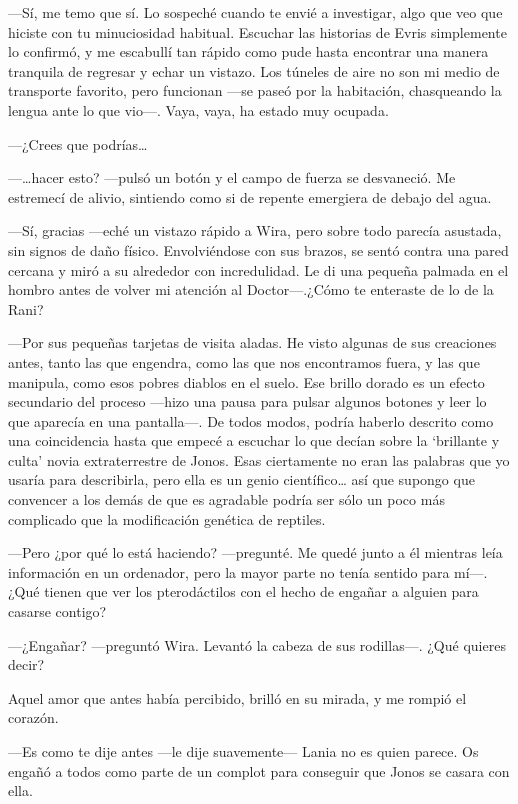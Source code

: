 ---Sí, me temo que sí. Lo sospeché cuando te envié a investigar, algo
que veo que hiciste con tu minuciosidad habitual. Escuchar las historias
de Evris simplemente lo confirmó, y me escabullí tan rápido como pude
hasta encontrar una manera tranquila de regresar y echar un vistazo. Los
túneles de aire no son mi medio de transporte favorito, pero funcionan
---se paseó por la habitación, chasqueando la lengua ante lo que vio---.
Vaya, vaya, ha estado muy ocupada.

---¿Crees que podrías\ldots{}

---\ldots{}hacer esto? ---pulsó un botón y el campo de fuerza se
desvaneció. Me estremecí de alivio, sintiendo como si de repente
emergiera de debajo del agua.

---Sí, gracias ---eché un vistazo rápido a Wira, pero sobre todo parecía
asustada, sin signos de daño físico. Envolviéndose con sus brazos, se
sentó contra una pared cercana y miró a su alrededor con incredulidad.
Le di una pequeña palmada en el hombro antes de volver mi atención al
Doctor---.¿Cómo te enteraste de lo de la Rani?

---Por sus pequeñas tarjetas de visita aladas. He visto algunas de sus
creaciones antes, tanto las que engendra, como las que nos encontramos
fuera, y las que manipula, como esos pobres diablos en el suelo. Ese
brillo dorado es un efecto secundario del proceso ---hizo una pausa para
pulsar algunos botones y leer lo que aparecía en una pantalla---. De
todos modos, podría haberlo descrito como una coincidencia hasta que
empecé a escuchar lo que decían sobre la `brillante y culta' novia
extraterrestre de Jonos. Esas ciertamente no eran las palabras que yo
usaría para describirla, pero ella es un genio científico\ldots{} así
que supongo que convencer a los demás de que es agradable podría ser
sólo un poco más complicado que la modificación genética de reptiles.

---Pero ¿por qué lo está haciendo? ---pregunté. Me quedé junto a él
mientras leía información en un ordenador, pero la mayor parte no tenía
sentido para mí---. ¿Qué tienen que ver los pterodáctilos con el hecho
de engañar a alguien para casarse contigo?

---¿Engañar? ---preguntó Wira. Levantó la cabeza de sus rodillas---.
¿Qué quieres decir?

Aquel amor que antes había percibido, brilló en su mirada, y me rompió
el corazón.

---Es como te dije antes ---le dije suavemente--- Lania no es quien
parece. Os engañó a todos como parte de un complot para conseguir que
Jonos se casara con ella.


